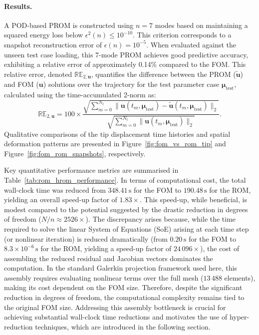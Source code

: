 \paragraph{Results.}
A POD-based PROM is constructed using \(n=7\) modes based on maintaining a squared energy loss below \(\epsilon^2(n) \le 10^{-10}\). This criterion corresponds to a snapshot reconstruction error of \(\epsilon(n) = 10^{-5}\). 
When evaluated against the unseen test case loading, this 7-mode PROM achieves good predictive accuracy, exhibiting a relative error of approximately 0.14\% compared to the FOM. 
This relative error, denoted \(\mathbb{RE}_{2,\mathbf{u}}\), quantifies the difference between the PROM (\(\mathbf{\tilde{u}}\)) and FOM (\(\mathbf{u}\)) solutions over the trajectory for the test parameter case \(\boldsymbol{\mu}_{\text{test}}\), calculated using the time-accumulated 2-norm as:
\begin{equation} \label{eq:relative_error_def}
\mathbb{RE}_{2,\mathbf{u}} = 100\times\frac{\sqrt{\sum_{m=0}^{N_t} \|\mathbf{u}(t_m, \boldsymbol{\mu}_{\text{test}}) - \mathbf{\tilde{u}}(t_m, \boldsymbol{\mu}_{\text{test}})\|_2}}{\sqrt{\sum_{m=0}^{N_t} \|\mathbf{u}(t_m, \boldsymbol{\mu}_{\text{test}})\|_2}}.
\end{equation}
Qualitative comparisons of the tip displacement time histories and spatial deformation patterns are presented in Figure~\ref{fig:fom_vs_rom_tip} and Figure~\ref{fig:fom_rom_snapshots}, respectively.

Key quantitative performance metrics are summarised in Table~\ref{tab:rom_hrom_performance}. 
In terms of computational cost, the total wall-clock time was reduced from $348.41\,\text{s}$ for the FOM to $190.48\,\text{s}$ for the ROM, yielding an overall speed-up factor of $1.83\times$. 
This speed-up, while beneficial, is modest compared to the potential suggested by the drastic reduction in degrees of freedom ($N/n \approx 2526\times$). 
The discrepancy arises because, while the time required to solve the linear System of Equations (SoE) arising at each time step (or nonlinear iteration) is reduced dramatically (from \(0.20\,\text{s}\) for the FOM to \(8.3 \times 10^{-6}\,\text{s}\) for the ROM, yielding a speed-up factor of \(24\,096\times\)), the cost of assembling the reduced residual and Jacobian vectors dominates the computation. 
In the standard Galerkin projection framework used here, this assembly requires evaluating nonlinear terms over the full mesh ($13\,488$ elements), making its cost dependent on the FOM size. 
Therefore, despite the significant reduction in degrees of freedom, the computational complexity remains tied to the original FOM size. Addressing this assembly bottleneck is crucial for achieving substantial wall-clock time reductions and motivates the use of hyper-reduction techniques, which are introduced in the following section.

